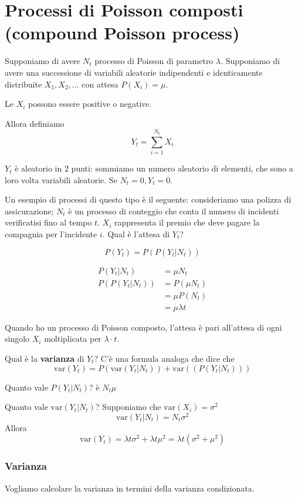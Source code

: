 \documentclass[a4paper,12pt]{book}
\begin{document}
\section{Processi di Poisson composti (compound Poisson process)}
Supponiamo di avere $ N_t $ processo di Poisson di parametro $\lambda$. Supponiamo di avere una successione di variabili aleatorie indipendenti e identicamente distribuite $ X_1, X_2, ... $ con attesa $ P(X_i) = \mu $.

Le $ X_i $ possono essere positive o negative. 

Allora definiamo
$$ Y_t = \sum_{i = 1}^{N_t} X_i $$

$ Y_t $ è aleatorio in 2 punti: sommiamo un numero aleatorio di elementi, che sono a loro volta variabili aleatorie. Se $ N_t = 0, Y_t = 0 $.

Un esempio di processi di questo tipo è il seguente: consideriamo una polizza di assicurazione; $ N_t $ è un processo di conteggio che conta il numero di incidenti verificatisi fino al tempo $ t $. $ X_i $ rappresenta il premio che deve pagare la compagnia per l'incidente $ i $. Qual è l'attesa di $ Y_t $?

$$ P(Y_t) = P(P(Y_t | N_t )) $$

\begin{align*}
	P(Y_t | N_t) & = \mu N_t \\ 
	P(P(Y_t | N_t )) & = P(\mu N_t) \\
	& = \mu P(N_t) \\
	& = \mu \lambda t
\end{align*}

Quando ho un processo di Poisson composto, l'attesa è pari all'attesa di ogni singolo $ X_i $ moltiplicata per $\lambda\cdot t$. 

Qual è la \textbf{varianza} di $ Y_t $? C'è una formula analoga che dice che 
$$ \text{var} (Y_t) = P(\mathrm{var}(Y_t | N_t)) + \mathrm{var}((P(Y_t | N_t)))$$

Quanto vale $ P(Y_t | N_t ) $? è $ N_t \mu $

Quanto vale $ \mathrm{var}(Y_t | N_t) $? Supponiamo che $\mathrm{var}(X_i) = \sigma^2$
$$ \mathrm{var}(Y_t | N_t) = N_t \sigma^2 $$
Allora
$$ \mathrm{var}(Y_t) = \lambda t \sigma^2 + \lambda t \mu^2 = \lambda t (\sigma^2 + \mu^2) $$

\subsubsection{Varianza}
Vogliamo calcolare la varianza in termini della varianza condizionata.
\end{document}
